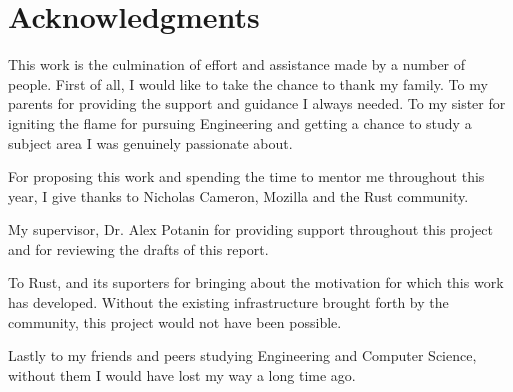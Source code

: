 \chapter*{Acknowledgments}\label{C:ack} 

This work is the culmination of effort and assistance made by a number of people. First of all, I would like to take the chance to thank my family.  To my parents for providing the support and guidance I always needed. To my sister for igniting the flame for pursuing Engineering and getting a chance to study a subject area I was genuinely passionate about.

For proposing this work and spending the time to mentor me throughout this year, I give thanks to Nicholas Cameron, Mozilla and the Rust community. 

My supervisor, Dr. Alex Potanin for providing support throughout this project and for reviewing the drafts of this report.

To Rust, and its suporters for bringing about the motivation for which this work has developed. Without the existing infrastructure brought forth by the community, this project would not have been possible.

Lastly to my friends and peers studying Engineering and Computer Science, without them I would have lost my way a long time ago.